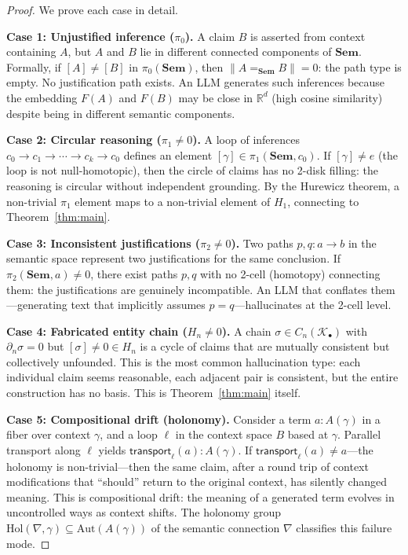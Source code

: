 \documentclass[11pt,a4paper]{article}
\theoremstyle{plain}
\theoremstyle{definition}
\newcommand{\Sem}{\mathbf{Sem}}
\newcommand{\transport}{\mathsf{transport}}
\begin{document}
\begin{proof}
We prove each case in detail.

\medskip
\textbf{Case 1: Unjustified inference ($\pi_0$).} A claim $B$ is asserted from context containing $A$, but $A$ and $B$ lie in different connected components of $\Sem$. Formally, if $[A] \neq [B]$ in $\pi_0(\Sem)$, then $\|A =_\Sem B\| = 0$: the path type is empty. No justification path exists. An LLM generates such inferences because the embedding $F(A)$ and $F(B)$ may be close in $\mathbb{R}^d$ (high cosine similarity) despite being in different semantic components.

\medskip
\textbf{Case 2: Circular reasoning ($\pi_1 \neq 0$).} A loop of inferences $c_0 \to c_1 \to \cdots \to c_k \to c_0$ defines an element $[\gamma] \in \pi_1(\Sem, c_0)$. If $[\gamma] \neq e$ (the loop is not null-homotopic), then the circle of claims has no 2-disk filling: the reasoning is circular without independent grounding. By the Hurewicz theorem, a non-trivial $\pi_1$ element maps to a non-trivial element of $H_1$, connecting to Theorem~\ref{thm:main}.

\medskip
\textbf{Case 3: Inconsistent justifications ($\pi_2 \neq 0$).} Two paths $p, q\colon a \to b$ in the semantic space represent two justifications for the same conclusion. If $\pi_2(\Sem, a) \neq 0$, there exist paths $p, q$ with no 2-cell (homotopy) connecting them: the justifications are genuinely incompatible. An LLM that conflates them---generating text that implicitly assumes $p = q$---hallucinates at the 2-cell level.

\medskip
\textbf{Case 4: Fabricated entity chain ($H_n \neq 0$).} A chain $\sigma \in C_n(\mathcal{K}_\bullet)$ with $\partial_n \sigma = 0$ but $[\sigma] \neq 0 \in H_n$ is a cycle of claims that are mutually consistent but collectively unfounded. This is the most common hallucination type: each individual claim seems reasonable, each adjacent pair is consistent, but the entire construction has no basis. This is Theorem~\ref{thm:main} itself.

\medskip
\textbf{Case 5: Compositional drift (holonomy).} Consider a term $a : A(\gamma)$ in a fiber over context $\gamma$, and a loop $\ell$ in the context space $B$ based at $\gamma$. Parallel transport along $\ell$ yields $\transport_\ell(a) : A(\gamma)$. If $\transport_\ell(a) \neq a$---the holonomy is non-trivial---then the same claim, after a round trip of context modifications that ``should'' return to the original context, has silently changed meaning. This is compositional drift: the meaning of a generated term evolves in uncontrolled ways as context shifts. The holonomy group $\mathrm{Hol}(\nabla, \gamma) \subseteq \mathrm{Aut}(A(\gamma))$ of the semantic connection $\nabla$ classifies this failure mode.
\end{proof}
\end{document}
